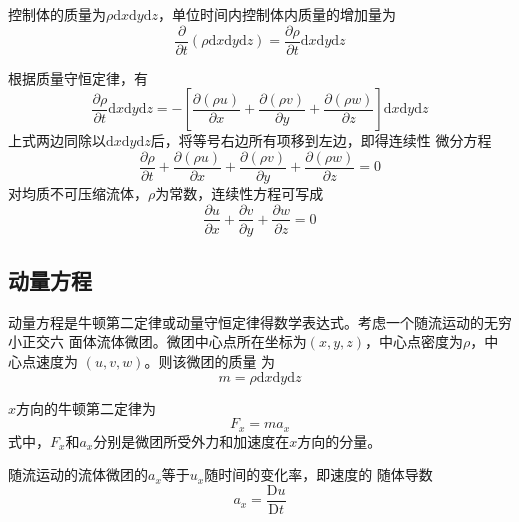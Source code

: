 控制体的质量为$\rho\mathrm{d}x\mathrm{d}y\mathrm{d}z$，单位时间内控制体内质量的增加量为
\begin{equation}
  \frac{\partial}{\partial t}(\rho\mathrm{d}x\mathrm{d}y\mathrm{d}z) =
  \frac{\partial \rho}{\partial  t}\mathrm{d}x\mathrm{d}y\mathrm{d}z
\end{equation}

根据质量守恒定律，有
\begin{equation}
  \frac{\partial \rho}{\partial  t}\mathrm{d}x\mathrm{d}y\mathrm{d}z
  =
  -
  \left[
    \frac {\partial (\rho u)} {\partial x}
    +
    \frac {\partial (\rho v)} {\partial y}
    +
    \frac {\partial (\rho w)} {\partial z}
  \right]
  \mathrm{d}x\mathrm{d}y\mathrm{d}z
\end{equation}
上式两边同除以$\mathrm{d}x\mathrm{d}y\mathrm{d}z$后，将等号右边所有项移到左边，即得连续性
微分方程
\begin{equation}
  \frac{\partial \rho}{\partial  t}
  +
  \frac{\partial (\rho u)}{\partial  x}
  +
  \frac{\partial (\rho v)}{\partial  y}
  +
  \frac{\partial (\rho w)}{\partial  z}
  =
  0
\end{equation}
对均质不可压缩流体，$\rho$为常数，连续性方程可写成
\begin{equation}
  \frac{\partial u}{\partial  x}
  +
  \frac{\partial v}{\partial  y}
  +
  \frac{\partial w}{\partial  z}
  =
  0
  \label{EqCGe_NS_Ce}
\end{equation}

\subsection{动量方程}
动量方程是牛顿第二定律或动量守恒定律得数学表达式。考虑一个随流运动的无穷小正交六
面体流体微团。微团中心点所在坐标为$(x,y,z)$，中心点密度为$\rho$，中心点速度为
$(u, v, w)$。则该微团的质量
为
\begin{equation}
  m = \rho\mathrm{d}x\mathrm{d}y\mathrm{d}z
\end{equation}

$x$方向的牛顿第二定律为
\begin{equation}
  F_{x} = ma_{x}
  \label{EqCGe_Nt_x}
\end{equation}
式中，$F_{x}$和$a_{x}$分别是微团所受外力和加速度在$x$方向的分量。

随流运动的流体微团的$a_{x}$等于$u_{x}$随时间的变化率，即速度的
随体导数
\begin{equation}
  a_{x} =
  \frac{\mathrm{D}u}{\mathrm{D}t}
  \label{EqCGe_Ac_x}
\end{equation}

